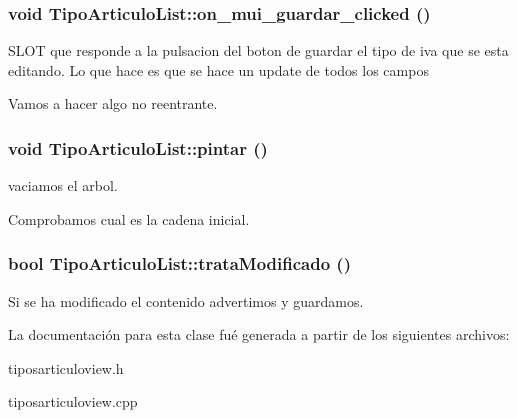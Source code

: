 \subsubsection{\setlength{\rightskip}{0pt plus 5cm}void Tipo\-Articulo\-List::on\_\-mui\_\-guardar\_\-clicked ()\hspace{0.3cm}{\tt  [virtual, slot]}}\label{classTipoArticuloList_i6}


SLOT que responde a la pulsacion del boton de guardar el tipo de iva que se esta editando. Lo que hace es que se hace un update de todos los campos

Vamos a hacer algo no reentrante. 
\subsubsection{\setlength{\rightskip}{0pt plus 5cm}void Tipo\-Articulo\-List::pintar ()\hspace{0.3cm}{\tt  [virtual, slot]}}\label{classTipoArticuloList_i7}


vaciamos el arbol.

Comprobamos cual es la cadena inicial. 
\subsubsection{\setlength{\rightskip}{0pt plus 5cm}bool Tipo\-Articulo\-List::trata\-Modificado ()}\label{classTipoArticuloList_a7}


Si se ha modificado el contenido advertimos y guardamos. 

La documentaci\'{o}n para esta clase fu\'{e} generada a partir de los siguientes archivos:\begin{CompactItemize}
\item 
tiposarticuloview.h\item 
tiposarticuloview.cpp\end{CompactItemize}
